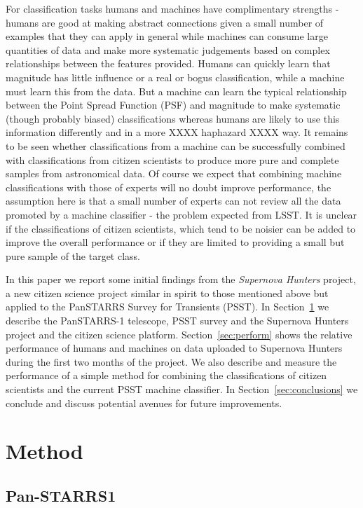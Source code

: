 \documentclass[a4paper,fleqn,usenatbib]{mnras}
\begin{document}
For classification tasks humans and machines have complimentary strengths - humans are good at making abstract connections given a small number of examples that they can apply in general while machines can consume large quantities of data and make more systematic judgements based on complex relationships between the features provided.  Humans can quickly learn that magnitude has little influence or a real or bogus classification, while a machine must learn this from the data.  But a machine can learn the typical relationship between the Point Spread Function (PSF) and magnitude to make systematic (though probably biased) classifications whereas humans are likely to use this information differently and in a more XXXX haphazard XXXX way.  It remains to be seen whether classifications from a machine can be successfully combined with classifications from citizen scientists to produce more pure and complete samples from astronomical data.  Of course we expect that combining machine classifications with those of experts will no doubt improve performance, the assumption here is that a small number of experts can not review all the data promoted by a machine classifier - the problem expected from LSST.  It is unclear if the classifications of citizen scientists, which tend to be noisier can be added to improve the overall performance or if they are limited to providing a small but pure sample of the target class.

In this paper we report some initial findings from the \textit{Supernova Hunters} project, a new citizen science project similar in spirit to those mentioned above but applied to the PanSTARRS Survey for Transients (PSST).  In Section~\ref{sec:method} we describe the PanSTARRS-1 telescope, PSST survey and the Supernova Hunters project and the citizen science platform.  Section~\ref{sec:perform} shows the relative performance of humans and machines on data uploaded to Supernova Hunters during the first two months of the project.  We also describe and measure the performance of a simple method for combining the classifications of citizen scientists and the current PSST machine classifier.  In Section~\ref{sec:conclusions} we conclude and discuss potential avenues for future improvements.

\section{Method}
\label{sec:method}
\subsection{Pan-STARRS1}
\label{sec:ps1}
\end{document}
